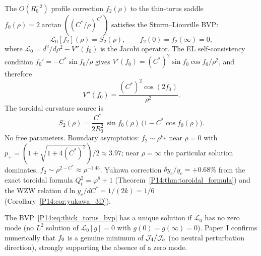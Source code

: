 \begin{theorem}
\label{P14:thm:jacobi}
The $O(R_0^{-2})$ profile correction $f_2(\rho)$ to the thin-torus
saddle $f_0(\rho) = 2\arctan((C^*/\rho)^{C^*})$ satisfies the
Sturm--Liouville BVP:
\begin{equation}
  \mathcal{L}_0[f_2](\rho) = S_2(\rho), \qquad f_2(0) = f_2(\infty) = 0,
  \label{P14:eq:thick_torus_bvp}
\end{equation}
where $\mathcal{L}_0 = d^2/d\rho^2 - V''(f_0)$ is the Jacobi operator.
The EL self-consistency condition $f_0'=-C^*\sin f_0/\rho$ gives
$V'(f_0)=(C^*)^2\sin f_0\cos f_0/\rho^2$, and therefore
\begin{equation}
  V''(f_0) = \frac{(C^*)^2\cos(2f_0)}{\rho^2}.
  \label{P14:eq:jacobi_potential}
\end{equation}
The toroidal curvature source is
\begin{equation}
  S_2(\rho) = \frac{C^*}{2R_0^2}\,\sin f_0(\rho)\,
              \bigl(1 - C^*\cos f_0(\rho)\bigr).
  \label{P14:eq:thick_torus_source}
\end{equation}
No free parameters.
Boundary asymptotics: $f_2\sim\rho^{p_+}$ near $\rho=0$ with
$p_+=(1+\sqrt{1+4(C^*)^2})/2\approx3.97$;
near $\rho=\infty$ the particular solution dominates,
$f_2\sim\rho^{2-C^*}\approx\rho^{-1.43}$.
Yukawa correction $\delta y_e/y_e = +0.68\%$ from the exact toroidal
formula $Q_t^2=\varphi^8+1$ (Theorem~\ref{P14:thm:toroidal_formula}) and the
WZW relation $d\ln y_e/dC^*=1/(2k)=1/6$ (Corollary~\ref{P14:cor:yukawa_3D}).
\end{theorem}

\begin{remark}[Solubility]
\label{P14:rem:solubility}
The BVP~\eqref{P14:eq:thick_torus_bvp} has a unique solution if $\mathcal{L}_0$ has no zero mode
(no $L^2$ solution of $\mathcal{L}_0[g]=0$ with $g(0)=g(\infty)=0$).
Paper~I confirms numerically that $f_0$ is a genuine minimum of $\mathcal{J}_4/\mathcal{J}_a$
(no neutral perturbation direction), strongly supporting the absence of a zero mode.
\end{remark}


